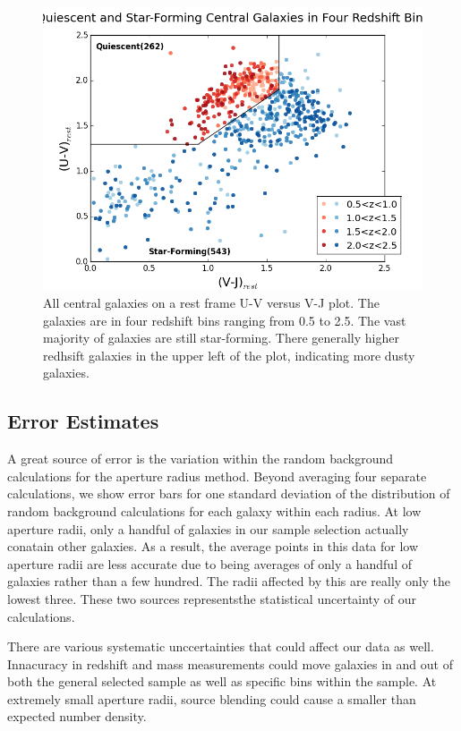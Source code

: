 \documentclass[apj]{emulateapj}
\begin{document}
\begin{figure}
\centering
\graphicspath{{C:/3d_hst/2015_finals/Colors/}}
\includegraphics[width=\linewidth]{color}
\caption{\footnotesize All central galaxies on a rest frame U-V versus V-J plot. The galaxies are in four redshift bins ranging from 0.5 to 2.5. The vast majority of galaxies are still star-forming. There generally higher redhsift galaxies in the upper left of the plot, indicating more dusty galaxies.}
\label{fig:color_z}
\end{figure}

\subsection{Error Estimates}

A great source of error is the variation within the random background calculations for the aperture radius method. Beyond averaging four separate calculations, we show error bars for one standard deviation of the distribution of random background calculations for each galaxy within each radius. At low aperture radii, only a handful of galaxies in our sample selection actually conatain other galaxies. As a result, the average points in this data for low aperture radii are less accurate due to being averages of only a handful of galaxies rather than a few hundred. The radii affected by this are really only the lowest three. These two sources representsthe statistical uncertainty of our calculations.

There are various systematic unccertainties that could affect our data as well. Innacuracy in redshift and mass measurements could move galaxies in and out of both the general selected sample as well as specific bins within the sample. At extremely small aperture radii, source blending could cause a smaller than expected number density. 
\end{document}
